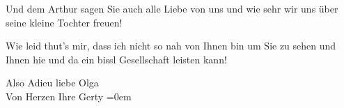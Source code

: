 \pstart
           Und dem Arthur sagen Sie auch alle Liebe von
               uns {\pb}und wie sehr wir uns über seine
               kleine Tochter freuen!\pend
           
\pstart
           Wie leid thut’s mir, dass ich nicht so nah von Ihnen bin um Sie zu sehen und Ihnen
               hie und da ein bissl Gesellschaft leisten kann!\pend
           
\pstart
           Also Adieu liebe Olga{\\[\baselineskip]}Von Herzen Ihre \spacefill\mbox{Gerty}\pend
           \leftskip=0em{}\endnumbering{}  \newcommand{\dateiname}{L01876}\newcommand{\titel}{Gerty von Hofmannsthal an Olga Schnitzler, 15. 9. 1909}\newcommand{\editorInnen}{Martin Anton Müller und Gerd-Hermann Susen}
